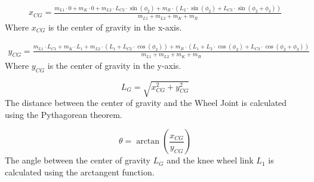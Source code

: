 	\begin{equation}
		\begin{aligned}
			x_{CG} = \frac{m_{L1} \cdot 0 + m_K \cdot 0 + m_{L2} \cdot L_{C2} \cdot \sin(\phi_2) + m_B \cdot (L_2 \cdot \sin(\phi_2) + L_{C3} \cdot \sin(\phi_2 + \phi_3))}{m_{L1} + m_{L2} + m_K + m_B}
		\end{aligned}
	\end{equation}
Where $x_{CG}$ is the center of gravity in the x-axis.

	\begin{equation}
		\begin{aligned}
			y_{CG} = \frac{m_{L1} \cdot L_{C1} + m_K \cdot L_1 + m_{L2} \cdot (L_1 + L_{C2} \cdot \cos(\phi_2)) + m_B \cdot (L_1 + L_2 \cdot \cos(\phi_2) + L_{C3} \cdot \cos(\phi_2 + \phi_3))}{m_{L1} + m_{L2} + m_K + m_B}
		\end{aligned}
	\end{equation}
Where $y_{CG}$ is the center of gravity in the y-axis.

	\begin{equation}
		L_G = \sqrt{x_{CG}^2 + y_{CG}^2}
	\end{equation}
The distance between the center of gravity and the Wheel Joint is calculated using the Pythagorean theorem.

	\begin{equation}
		\theta = \arctan\left(\frac{{x_{CG}}}{{y_{CG}}}\right)
	\end{equation}
The angle between the center of gravity $L_G$ and the knee wheel link $L_1$ is calculated using the arctangent function.

